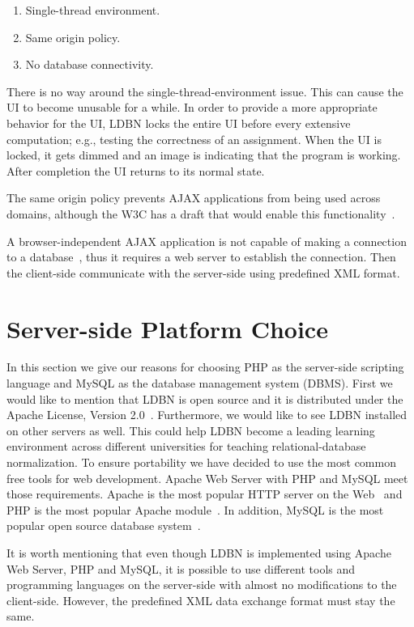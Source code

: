 \begin{enumerate}
	\item Single-thread environment.
	\item Same origin policy.
	\item No database connectivity.
\end{enumerate}

There is no way around the single-thread-environment issue. This can cause the UI
to become unusable for a while. In order to provide a more appropriate behavior 
for the UI, LDBN locks the entire UI before every extensive computation; e.g.,
testing the correctness of an assignment. When the UI is locked,
it gets dimmed and an image is indicating that the program is working. After 
completion the UI returns to its normal state. 

The same origin policy prevents AJAX applications from being used across domains,
although the W3C has a draft that would enable this functionality~\cite{bajax1}.

A browser-independent AJAX application is not capable of making a connection 
to a database~\cite{bajax1}, thus it requires a web server to establish the 
connection. Then the client-side communicate with the server-side using 
predefined XML format.

\section{Server-side Platform Choice}
In this section we give our reasons for choosing PHP as the server-side
scripting language and MySQL as the database management system (DBMS). First we would
like to mention that LDBN is open source and it is distributed under the 
Apache License, Version 2.0~\cite{walv2}. Furthermore, we would like to see 
LDBN installed on other servers as well. This could help LDBN become
a leading learning environment across 
different universities for teaching relational-database normalization. To ensure 
portability we have decided to use the most common free 
tools for web development. Apache Web Server with PHP and MySQL meet those requirements. 
Apache is the most popular HTTP server on the Web~\cite{w3} and PHP is the most popular 
Apache module~\cite{w4}. In addition, MySQL is the most popular open source 
database system~\cite{w5}.
 
It is worth mentioning that even though LDBN is implemented using Apache Web Server,
PHP and MySQL, it is possible to use different tools and programming languages 
on the server-side with almost no modifications to the client-side. However, 
the predefined XML data exchange format must stay the same.

